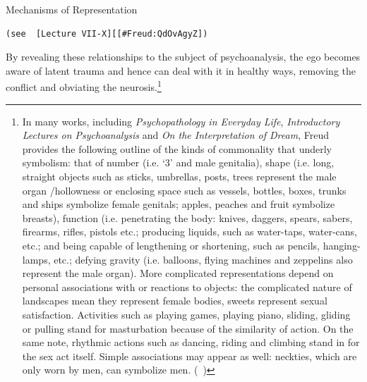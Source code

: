 \begin{refsection}
\begin{apatextbox}{Mechanisms of Representation}
 \\

\label{mechanismofrepresentation}
\end{apatextbox}

\begin{verbatim}
(see  [Lecture VII-X][[#Freud:QdOvAgyZ])
\end{verbatim}

By revealing these relationships to the subject of psychoanalysis, the ego becomes aware of latent trauma and hence can deal with it in healthy ways, removing the conflict and obviating the neurosis.\footnote{In many works, including \emph{Psychopathology in Everyday Life}, \emph{Introductory Lectures on Psychoanalysis} and \emph{On the Interpretation of Dream}, Freud provides the following outline of the kinds of commonality that underly symbolism: that of number (i.e. `3' and male genitalia), shape (i.e. long, straight objects such as sticks, umbrellas, posts, trees represent the male organ \slash  hollowness or enclosing space such as vessels, bottles, boxes, trunks and ships symbolize female genitals; apples, peaches and fruit symbolize breasts), function (i.e. penetrating the body: knives, daggers, spears, sabers, firearms, rifles, pistols etc.; producing liquids, such as water-taps, water-cans, etc.; and being capable of lengthening or shortening, such as pencils, hanging-lamps, etc.; defying gravity (i.e. balloons, flying machines and zeppelins also represent the male organ). More complicated representations depend on personal associations with or reactions to objects: the complicated nature of landscapes mean they represent female bodies, sweets represent sexual satisfaction. Activities such as playing games, playing piano, sliding, gliding or pulling stand for masturbation because of the similarity of action. On the same note, rhythmic actions such as dancing, riding and climbing stand in for the sex act itself. Simple associations may appear as well: neckties, which are only worn by men, can symbolize men. (~\citep[p. 188--204]{Freud:QdOvAgyZ})}


\end{refsection}
